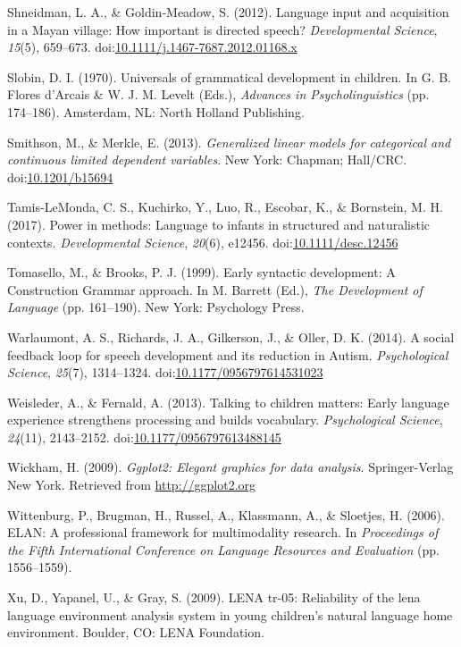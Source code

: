 \documentclass[,man,floatsintext]{apa6}
\begin{document}
\hypertarget{ref-shneidman2012language}{}
Shneidman, L. A., \& Goldin-Meadow, S. (2012). Language input and
acquisition in a Mayan village: How important is directed speech?
\emph{Developmental Science}, \emph{15}(5), 659--673.
doi:\href{https://doi.org/10.1111/j.1467-7687.2012.01168.x}{10.1111/j.1467-7687.2012.01168.x}

\hypertarget{ref-slobin1970universals}{}
Slobin, D. I. (1970). Universals of grammatical development in children.
In G. B. Flores d'Arcais \& W. J. M. Levelt (Eds.), \emph{Advances in
Psycholinguistics} (pp. 174--186). Amsterdam, NL: North Holland
Publishing.

\hypertarget{ref-smithson2013generalized}{}
Smithson, M., \& Merkle, E. (2013). \emph{Generalized linear models for
categorical and continuous limited dependent variables}. New York:
Chapman; Hall/CRC.
doi:\href{https://doi.org/10.1201/b15694}{10.1201/b15694}

\hypertarget{ref-tamislemonda2017power}{}
Tamis-LeMonda, C. S., Kuchirko, Y., Luo, R., Escobar, K., \& Bornstein,
M. H. (2017). Power in methods: Language to infants in structured and
naturalistic contexts. \emph{Developmental Science}, \emph{20}(6),
e12456.
doi:\href{https://doi.org/10.1111/desc.12456}{10.1111/desc.12456}

\hypertarget{ref-tomasello1999early}{}
Tomasello, M., \& Brooks, P. J. (1999). Early syntactic development: A
Construction Grammar approach. In M. Barrett (Ed.), \emph{The
Development of Language} (pp. 161--190). New York: Psychology Press.

\hypertarget{ref-warlaumont2014social}{}
Warlaumont, A. S., Richards, J. A., Gilkerson, J., \& Oller, D. K.
(2014). A social feedback loop for speech development and its reduction
in Autism. \emph{Psychological Science}, \emph{25}(7), 1314--1324.
doi:\href{https://doi.org/10.1177/0956797614531023}{10.1177/0956797614531023}

\hypertarget{ref-weisleder2013talking}{}
Weisleder, A., \& Fernald, A. (2013). Talking to children matters: Early
language experience strengthens processing and builds vocabulary.
\emph{Psychological Science}, \emph{24}(11), 2143--2152.
doi:\href{https://doi.org/10.1177/0956797613488145}{10.1177/0956797613488145}

\hypertarget{ref-R-ggplot2}{}
Wickham, H. (2009). \emph{Ggplot2: Elegant graphics for data analysis}.
Springer-Verlag New York. Retrieved from \url{http://ggplot2.org}

\hypertarget{ref-ELAN}{}
Wittenburg, P., Brugman, H., Russel, A., Klassmann, A., \& Sloetjes, H.
(2006). ELAN: A professional framework for multimodality research. In
\emph{Proceedings of the Fifth International Conference on Language
Resources and Evaluation} (pp. 1556--1559).

\hypertarget{ref-xu2009reliability}{}
Xu, D., Yapanel, U., \& Gray, S. (2009). LENA tr-05: Reliability of the
lena language environment analysis system in young children's natural
language home environment. Boulder, CO: LENA Foundation.

\endgroup
\end{document}
